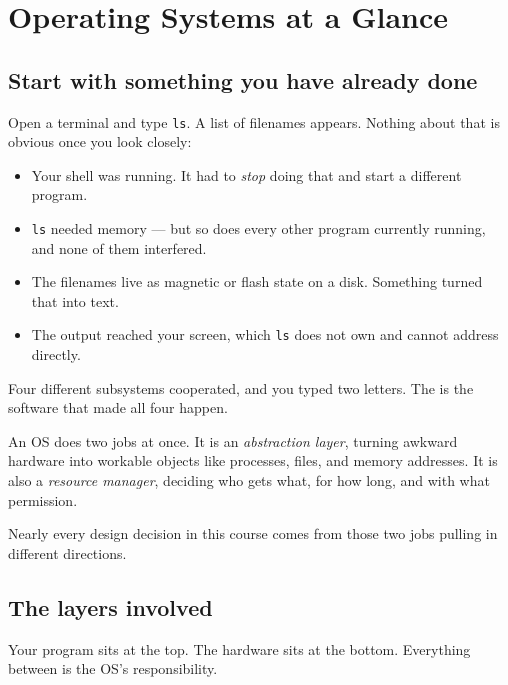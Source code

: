 \chapter{Operating Systems at a Glance}\label{ch:overview}

\section{Start with something you have already done}
Open a terminal and type \texttt{ls}. A list of filenames appears. Nothing about that is obvious once you look closely:

\begin{itemize}
  \item Your shell was running. It had to \emph{stop} doing that and start a different program.
  \item \texttt{ls} needed memory --- but so does every other program currently running, and none of them interfered.
  \item The filenames live as magnetic or flash state on a disk. Something turned that into text.
  \item The output reached your screen, which \texttt{ls} does not own and cannot address directly.
\end{itemize}

Four different subsystems cooperated, and you typed two letters. The  is the software that made all four happen.

\begin{keyidea}
An OS does two jobs at once. It is an \emph{abstraction layer}, turning awkward hardware into workable objects like processes, files, and memory addresses. It is also a \emph{resource manager}, deciding who gets what, for how long, and with what permission.

Nearly every design decision in this course comes from those two jobs pulling in different directions.
\end{keyidea}

\section{The layers involved}
Your program sits at the top. The hardware sits at the bottom. Everything between is the OS's responsibility.

